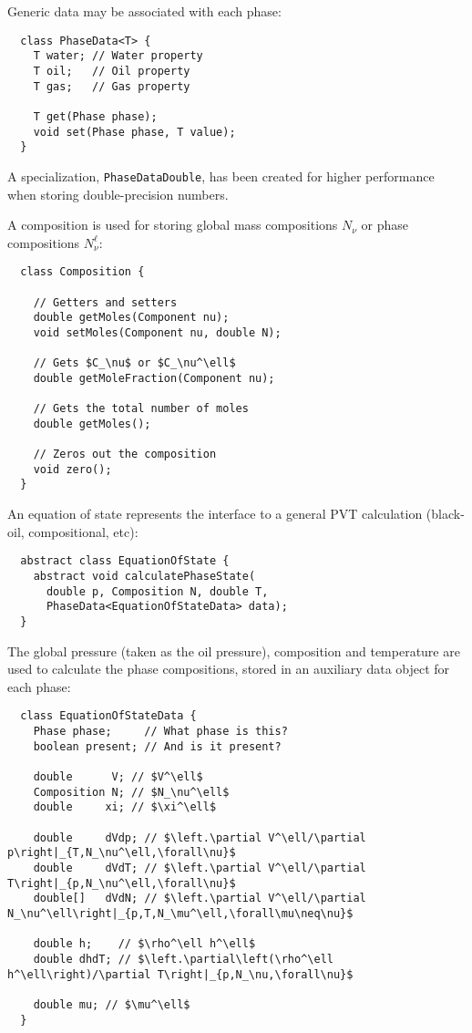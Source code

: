 Generic data may be associated with each phase:
\begin{lstlisting}
  class PhaseData<T> {
    T water; // Water property
    T oil;   // Oil property
    T gas;   // Gas property

    T get(Phase phase);
    void set(Phase phase, T value);
  }
\end{lstlisting}
A specialization, \texttt{PhaseDataDouble}, has been created for
higher performance when storing double-precision numbers.

A composition is used for storing global mass compositions $N_\nu$ or
phase compositions $N_\nu^\ell$:
\begin{lstlisting}
  class Composition {

    // Getters and setters
    double getMoles(Component nu);
    void setMoles(Component nu, double N);

    // Gets $C_\nu$ or $C_\nu^\ell$
    double getMoleFraction(Component nu);

    // Gets the total number of moles
    double getMoles();

    // Zeros out the composition
    void zero();
  }
\end{lstlisting}



An equation of state represents the interface to a general PVT
calculation (black-oil, compositional, etc):

\begin{lstlisting}
  abstract class EquationOfState {
    abstract void calculatePhaseState(
      double p, Composition N, double T,
      PhaseData<EquationOfStateData> data);
  }
\end{lstlisting}
The global pressure (taken as the oil pressure), composition and
temperature are used to calculate the phase compositions, stored in an
auxiliary data object for each phase:

\begin{lstlisting}
  class EquationOfStateData {
    Phase phase;     // What phase is this?
    boolean present; // And is it present?

    double      V; // $V^\ell$
    Composition N; // $N_\nu^\ell$
    double     xi; // $\xi^\ell$

    double     dVdp; // $\left.\partial V^\ell/\partial p\right|_{T,N_\nu^\ell,\forall\nu}$
    double     dVdT; // $\left.\partial V^\ell/\partial T\right|_{p,N_\nu^\ell,\forall\nu}$
    double[]   dVdN; // $\left.\partial V^\ell/\partial N_\nu^\ell\right|_{p,T,N_\mu^\ell,\forall\mu\neq\nu}$

    double h;    // $\rho^\ell h^\ell$
    double dhdT; // $\left.\partial\left(\rho^\ell h^\ell\right)/\partial T\right|_{p,N_\nu,\forall\nu}$

    double mu; // $\mu^\ell$
  }
\end{lstlisting}

